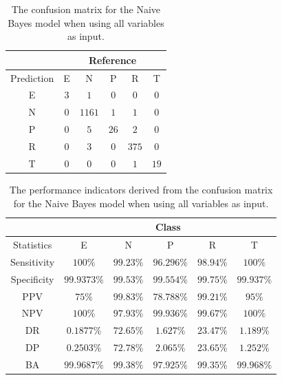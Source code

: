\documentclass[sn-mathphys-num]{sn-jnl}%
\begin{document}
\begin{table}[!ht]
    \centering
    \caption{The confusion matrix for the Naive Bayes model when using all variables as input.}
	\label{tab:cm:all:nb}
	\begin{tabular}{|c|c|c|c|c|c|}
		\hline
		 & \multicolumn{5}{|c|}{Reference} \\ \hline
		 Prediction & E & N & P & R & T \\ \hline
		 E & $3$ & $1$ & $0$ & $0$ & $0$ \\ \hline
		 N & $0$ & $1161$ & $1$ & $1$ & $0$ \\ \hline
		 P & $0$ & $5$ & $26$ & $2$ & $0$ \\ \hline
		 R & $0$ & $3$ & $0$ & $375$ & $0$ \\ \hline
		 T & $0$ & $0$ & $0$ & $1$ & $19$ \\ \hline
	\end{tabular}
\end{table}

\begin{table}[!ht]
    \centering
    \caption{The performance indicators derived from the confusion matrix for the Naive Bayes model when using all variables as input.}
	\label{tab:cs:reverse:all:nb}
	\begin{tabular}{|c|c|c|c|c|c|}
		\hline
		 & \multicolumn{5}{c|}{Class} \\ \hline
		Statistics & E & N & P & R & T \\ \hline
		Sensitivity & $100\%$ & $99.23\%$ & $96.296\%$ & $98.94\%$ & $100\%$ \\ \hline
		Specificity & $99.9373\%$ & $99.53\%$ & $99.554\%$ & $99.75\%$ & $99.937\%$ \\ \hline
		PPV & $75\%$ & $99.83\%$ & $78.788\%$ & $99.21\%$ & $95\%$ \\ \hline
		NPV & $100\%$ & $97.93\%$ & $99.936\%$ & $99.67\%$ & $100\%$ \\ \hline
		DR & $0.1877\%$ & $72.65\%$ & $1.627\%$ & $23.47\%$ & $1.189\%$ \\ \hline
		DP & $0.2503\%$ & $72.78\%$ & $2.065\%$ & $23.65\%$ & $1.252\%$ \\ \hline
		BA & $99.9687\%$ & $99.38\%$ & $97.925\%$ & $99.35\%$ & $99.968\%$ \\ \hline
	\end{tabular}
\end{table}
\end{document}
